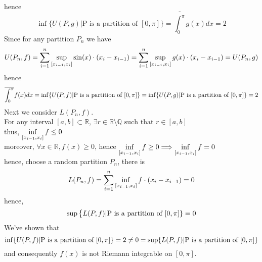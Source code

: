 \documentclass{article}
\def\R{\mathbb{R}}
\def\Q{\mathbb{Q}}
\def\imply{\Longrightarrow}
\begin{document}
\\hence 
$$\inf\big\{U(P, g)| \text{P is a partition of $[0,\pi]$}\big\}=\overline{\int_{0}^{\pi}}g(x)dx=2$$
Since for any partition $P_n$ we have 
$$U(P_n,f)=\sum_{i=1}^{n}\sup\limits_{[x_{i-1}, x_i]}\sin(x) \cdot (x_i-x_{i-1})=\sum_{i=1}^{n}\sup\limits_{[x_{i-1}, x_i]}g(x) \cdot(x_i-x_{i-1})=U(P_n, g)$$
hence 
$$\overline{\int_{0}^{\pi}}f(x)dx=\inf\{U(P, f)|\text{P is a partition of $[0,\pi]$}\}=\inf\{U(P, g)|\text{P is a partition of $[0,\pi]$}\}=2$$
Next we consider $L(P_n, f)$.
\\For any interval $[a, b]\subset \R$, $\exists r\in \R\setminus\Q \text{ such that } r\in [a, b]$
\\thus, $\inf\limits_{[x_{i-1}, x_{i}]}f\le 0$
\\moreover, $\forall x\in \R, f(x)\ge 0$, hence $\inff\ge0 \imply \inff=0$
\\hence, choose a random partition $P_n$, there is 
$$L(P_n, f)=\sum_{i=1}^{n}\inf\limits_{[x_{i-1}, x_{i}]}f\cdot (x_{i}-x_{i-1})=0$$
hence, 
$$\sup\big\{L(P, f)|\text{P is a partition of $[0,\pi]$}\}=0$$
We've shown that
$$\inf\{U(P, f)|\text{P is a partition of $[0, \pi]$}\}=2\neq 0=\sup\{L(P, f)|\text{P is a partition of $[0,\pi]$}\}$$
and consequently $f(x)$ is not Riemann integrable on $[0, \pi]$.

\section{} %
\end{document}
